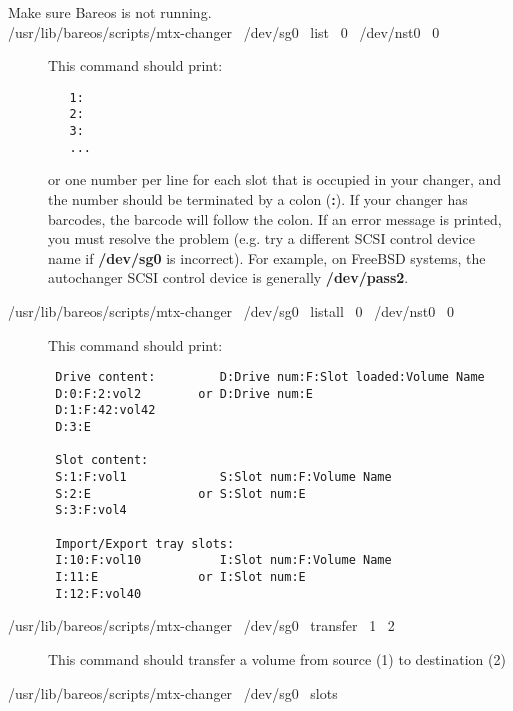 \begin{description}

\item [Make sure Bareos is not running.]

\item [/usr/lib/bareos/scripts/mtx-changer \ /dev/sg0 \ list \ 0 \ /dev/nst0 \ 0]

This command should print:

\footnotesize
\begin{verbatim}
   1:
   2:
   3:
   ...

\end{verbatim}
\normalsize

or one number per line for each slot that is  occupied in your changer, and
the number should be  terminated by a colon ({\bf :}). If your changer has
barcodes, the barcode will follow the colon.  If an error message is printed,
you must resolve the  problem (e.g. try a different SCSI control device name
if {\bf /dev/sg0}  is incorrect). For example, on FreeBSD systems, the
autochanger  SCSI control device is generally {\bf /dev/pass2}.

\item [/usr/lib/bareos/scripts/mtx-changer \ /dev/sg0 \ listall \ 0 \ /dev/nst0 \ 0]

This command should print:

\footnotesize
\begin{verbatim}
 Drive content:         D:Drive num:F:Slot loaded:Volume Name
 D:0:F:2:vol2        or D:Drive num:E
 D:1:F:42:vol42
 D:3:E

 Slot content:
 S:1:F:vol1             S:Slot num:F:Volume Name
 S:2:E               or S:Slot num:E
 S:3:F:vol4

 Import/Export tray slots:
 I:10:F:vol10           I:Slot num:F:Volume Name
 I:11:E              or I:Slot num:E
 I:12:F:vol40

\end{verbatim}
\normalsize

\item [/usr/lib/bareos/scripts/mtx-changer \ /dev/sg0 \ transfer \ 1 \ 2]

This command should transfer a volume from source (1) to destination (2)

\item [/usr/lib/bareos/scripts/mtx-changer \ /dev/sg0 \ slots ]


\end{description}

